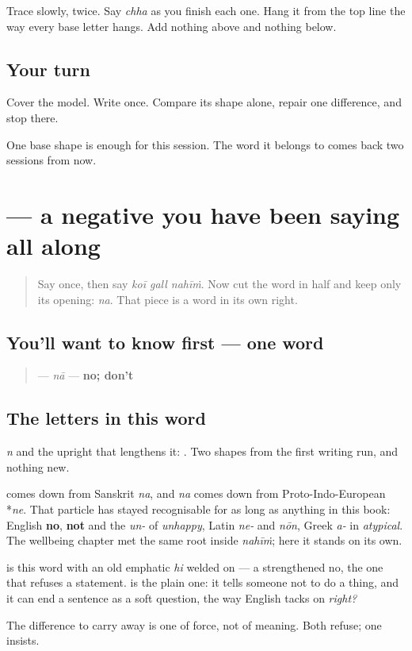 Trace \textbf{} slowly, twice. Say \emph{chha} as you finish each one. Hang it from the top line the way every base letter hangs. Add nothing above and nothing below.

\subsection*{Your turn}
Cover the model. Write \textbf{} once. Compare its shape alone, repair one difference, and stop there.

\begin{tcolorbox}[breakable,colback=teal!4,colframe=teal!35!black,title={Before you move on}]
One base shape is enough for this session. The word it belongs to comes back two sessions from now.
\end{tcolorbox}
\section[\texorpdfstring{\pa{ਨਾ} (nā)}{ਨਾ (nā)}]{ — a negative you have been saying all along}

\label{lesson:PA-C31-na}



\begin{quote}
Say \textbf{} once, then say \emph{koī gall nahīṁ}. Now cut the word in half and keep only its opening: \emph{na}. That piece is a word in its own right.
\end{quote}

\subsection*{You'll want to know first — one word}
\begin{quote}
\textbf{} — \emph{nā} — \textbf{no; don't}
\end{quote}

\subsection*{The letters in this word}
\textbf{} \emph{n} and the upright \textbf{} that lengthens it: \textbf{}. Two shapes from the first writing run, and nothing new.

\begin{cousinweb}
\textbf{} comes down from Sanskrit \emph{na}, and \emph{na} comes down from Proto-Indo-European *\emph{ne}. That particle has stayed recognisable for as long as anything in this book: English \textbf{no}, \textbf{not} and the \emph{un-} of \emph{unhappy}, Latin \emph{ne-} and \emph{nōn}, Greek \emph{a-} in \emph{atypical}. The wellbeing chapter met the same root inside \emph{nahīṁ}; here it stands on its own.

\textbf{} is this word with an old emphatic \emph{hi} welded on — a strengthened no, the one that refuses a statement. \textbf{} is the plain one: it tells someone not to do a thing, and it can end a sentence as a soft question, the way English tacks on \emph{right?}

The difference to carry away is one of force, not of meaning. Both refuse; one insists.
\end{cousinweb}

